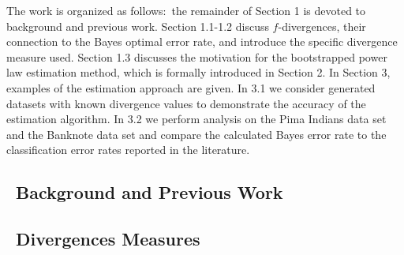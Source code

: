 \documentclass{article}
\begin{document}
 	\indent	The work is organized as follows:\ the remainder of Section 1 is devoted to background and previous work. Section 1.1-1.2 discuss $f$-divergences, their connection to the Bayes optimal error rate, and introduce the specific divergence measure used. Section 1.3 discusses the motivation for the bootstrapped power law estimation method, which is formally introduced in Section 2. 
 	In Section 3, examples of the estimation approach are given. In 3.1 we consider generated datasets with known divergence values to demonstrate the accuracy of the estimation algorithm. In 3.2 we perform analysis on the Pima Indians data set and the Banknote data set and compare the calculated Bayes error rate to the classification error rates reported in the literature.
	\subsection*{\ Background and Previous Work}	

	\subsection{\ Divergences Measures}
\end{document}
